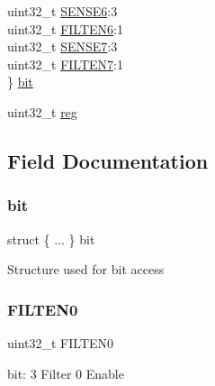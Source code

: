 \begin{DoxyCompactItemize}
\begin{tabbing}
\>uint32\_t \mbox{\hyperlink{union_e_i_c___c_o_n_f_i_g___type_ab761029d8def8e5425d57854dcdeb371}{SENSE6}}:3\\
\>uint32\_t \mbox{\hyperlink{union_e_i_c___c_o_n_f_i_g___type_ab10d305be331f249f343f2b77cd2d55f}{FILTEN6}}:1\\
\>uint32\_t \mbox{\hyperlink{union_e_i_c___c_o_n_f_i_g___type_a7972a41517fe4d04628710ff3bd762d9}{SENSE7}}:3\\
\>uint32\_t \mbox{\hyperlink{union_e_i_c___c_o_n_f_i_g___type_aaf5a3ae6c4c28971950035617fa32103}{FILTEN7}}:1\\
\} \mbox{\hyperlink{union_e_i_c___c_o_n_f_i_g___type_af2c13b693f1f590188e1bcc4fde89641}{bit}}\\

\end{tabbing}\item 
uint32\+\_\+t \mbox{\hyperlink{union_e_i_c___c_o_n_f_i_g___type_a6b91636401516a477989a336376d7b40}{reg}}
\end{DoxyCompactItemize}


\subsection{Field Documentation}
\mbox{\label{union_e_i_c___c_o_n_f_i_g___type_af2c13b693f1f590188e1bcc4fde89641}} 
\subsubsection{\texorpdfstring{bit}{bit}}
{\footnotesize\ttfamily struct \{ ... \}   bit}

Structure used for bit access \mbox{\label{union_e_i_c___c_o_n_f_i_g___type_a055b478e24a9b61807ed6d8e173652b9}} 
\subsubsection{\texorpdfstring{FILTEN0}{FILTEN0}}
{\footnotesize\ttfamily uint32\+\_\+t F\+I\+L\+T\+E\+N0}

bit\+: 3 Filter 0 Enable \mbox{\label{union_e_i_c___c_o_n_f_i_g___type_a949d5a2ba959bfc7bc597a8779960069}} 
